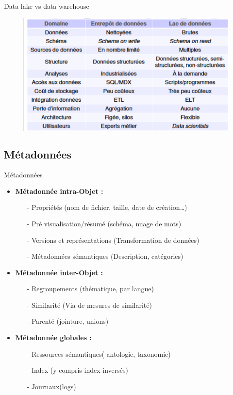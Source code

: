 \begin{frame}{Data lake vs data warehouse}
    \begin{figure}
        \centering
        \includegraphics[scale=0.6]{figures/lakevs.PNG}
    \end{figure}
\end{frame}

\subsection{Métadonnées}
\begin{frame}{Métadonnées}
    \begin{itemize}\itemsep1em
        \item \textbf{Métadonnée intra-Objet :}
        \begin{itemize}
            \item[-] Propriétés (nom de fichier, taille, date de création…)
            \item[-] Pré visualisation/résumé (schéma, nuage de mots)
            \item[-] Versions et représentations (Transformation de données)
            \item[-] Métadonnées sémantiques (Description, catégories)
        \end{itemize}
        \item \textbf{Métadonnée inter-Objet :}
        \begin{itemize}
            \item[-] Regroupements (thématique, par langue)
            \item[-] Similarité (Via de mesures de similarité)
            \item[-] Parenté (jointure, unions)
        \end{itemize}
        \item \textbf{Métadonnée globales :}
        \begin{itemize}
            \item[-] Ressources sémantiques( antologie, taxonomie)
            \item[-] Index (y compris index inversés)
            \item[-] Journaux(logs)
        \end{itemize}
    \end{itemize}
\end{frame}

